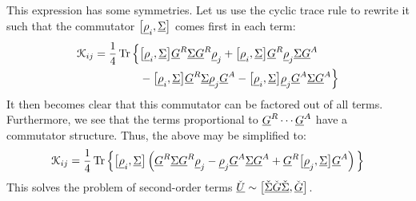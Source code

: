 This expression has some symmetries.
Let us use the cyclic trace rule to rewrite it such that the commutator $\big[ {\underline{\rho}}_i, {\underline{\Sigma}} \big]$ comes first in each term:
\begin{align*}
  \mathcal{K}_{ij} = 
  \frac{1}{4} \operatorname{Tr} 
  \Big\{
  &   \big[ {\underline{\rho}}_i, {\underline{\Sigma}} \big] {\underline{G}}^R {\underline{\Sigma}} {\underline{G}}^R {\underline{\rho}}_j
    + \big[ {\underline{\rho}}_i, {\underline{\Sigma}} \big] {\underline{G}}^R {\underline{\rho}}_j {\underline{\Sigma}} {\underline{G}}^A \\
  & - \big[ {\underline{\rho}}_i, {\underline{\Sigma}} \big] {\underline{G}}^R {\underline{\Sigma}} {\underline{\rho}}_j {\underline{G}}^A
    - \big[ {\underline{\rho}}_i, {\underline{\Sigma}} \big] {\underline{\rho}}_j {\underline{G}}^A {\underline{\Sigma}} {\underline{G}}^A
  \Big\}
\end{align*}
It then becomes clear that this commutator can be factored out of all terms.
Furthermore, we see that the terms proportional to ${\underline{G}}^R \cdots {\underline{G}}^A$ have a commutator structure.
Thus, the above may be simplified to:
\begin{align*}
  \mathcal{K}_{ij} = 
  \frac{1}{4} \operatorname{Tr} 
  \Big\{
      \big[ {\underline{\rho}}_i, {\underline{\Sigma}} \big]
      \left( 
        {\underline{G}}^R {\underline{\Sigma}} {\underline{G}}^R {\underline{\rho}}_j
      - {\underline{\rho}}_j {\underline{G}}^A {\underline{\Sigma}} {\underline{G}}^A
      + {\underline{G}}^R \big[{\underline{\rho}}_j, {\underline{\Sigma}} \big] {\underline{G}}^A
      \right)
  \Big\}
\end{align*}
This solves the problem of second-order terms $\check{\underline{U}} \sim \big[\check{\underline{\Sigma}}\check{\underline{G}}\check{\underline{\Sigma}}, \check{\underline{G}}\big]$.

